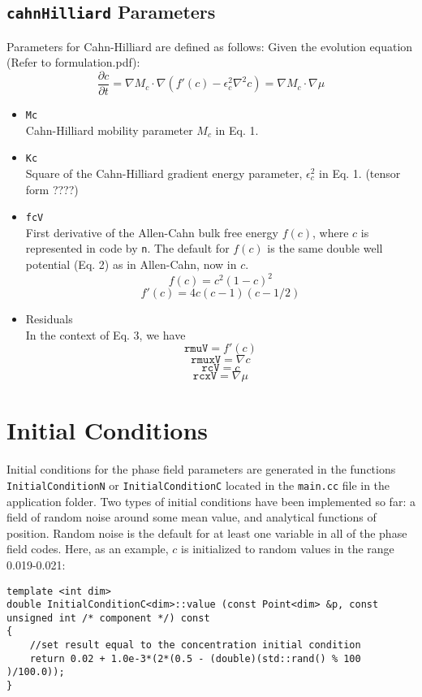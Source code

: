 \documentclass[11pt]{article}
\begin{document}
\subsection{\texttt{cahnHilliard} Parameters}
Parameters for Cahn-Hilliard are defined as follows:
Given the evolution equation (Refer to formulation.pdf):
\begin{equation}
\frac{\partial c}{\partial t} = \nabla M_c \cdot \nabla \left( f'(c) - \epsilon_c^2 \nabla^2 c \right) = \nabla M_c \cdot \nabla \mu
\end{equation}
\begin{itemize}
\item \texttt{Mc} \\
	Cahn-Hilliard mobility parameter $M_c$ in Eq. 1.
\item \texttt{Kc} \\
	Square of the Cahn-Hilliard gradient energy parameter, $\epsilon_c^2$ in Eq. 1.  (tensor form ????)
\item \texttt{fcV} \\
	First derivative of the Allen-Cahn bulk free energy $f(c)$, where $c$ is represented in code by \texttt{n}.  The default for $f(c)$ is the same double well 			potential (Eq. 2) as in Allen-Cahn, now in $c$.
	\[ f(c) = c^2 (1-c)^2 \]
	\[ f'(c) = 4c (c -1)(c - 1/2) \]
\item Residuals \\
	In the context of Eq. 3, we have
	\[ \texttt{rmuV} = f'(c) \]
	\[ \texttt{rmuxV} = \nabla c \]
	\[ \texttt{rcV} = c \]
	\[ \texttt{rcxV} = \nabla \mu \]
\end{itemize}

\section{Initial Conditions}
\paragraph{}
Initial conditions for the phase field parameters are generated in the functions \\ \texttt{InitialConditionN} or \texttt{InitialConditionC} located in the \texttt{main.cc} file in the application folder.  Two types of initial conditions have been implemented so far: a field of random noise around some mean value, and analytical functions of position.  Random noise is the default for at least one variable in all of the phase field codes.  Here, as an example, $c$ is initialized to random values in the range 0.019-0.021:
\begin{lstlisting}
template <int dim>
double InitialConditionC<dim>::value (const Point<dim> &p, const unsigned int /* component */) const
{
	//set result equal to the concentration initial condition
	return 0.02 + 1.0e-3*(2*(0.5 - (double)(std::rand() % 100 )/100.0));
}
\end{lstlisting}
\end{document}
